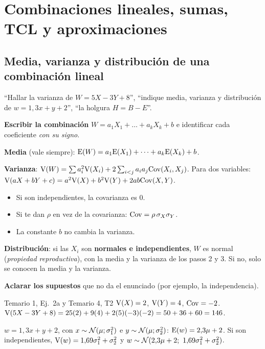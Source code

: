 \newpage
\section{Combinaciones lineales, sumas, TCL y aproximaciones}

\subsection{Media, varianza y distribución de una combinación lineal}\label{p:comblin}
\begin{cuando}
``Hallar la varianza de $W=5X-3Y+8$'', ``indique media, varianza y distribución de $w=1{,}3x+y+2$'', ``la holgura $H=B-E$''.
\end{cuando}
\begin{pasos}
\begin{pasolista}
\item \textbf{Escribir la combinación} $W=a_1X_1+\dots+a_kX_k+b$ e identificar cada coeficiente \emph{con su signo}.
\item \textbf{Media} (vale siempre): $\mathrm{E}(W)=a_1\mathrm{E}(X_1)+\dots+a_k\mathrm{E}(X_k)+b$.
\item \textbf{Varianza}: $\mathrm{V}(W)=\sum a_i^2\mathrm{V}(X_i)+2\sum_{i<j}a_ia_j\mathrm{Cov}(X_i,X_j)$. Para dos variables: $\mathrm{V}(aX+bY+c)=a^2\mathrm{V}(X)+b^2\mathrm{V}(Y)+2ab\mathrm{Cov}(X,Y)$.
\begin{itemize}
\item Si son independientes, la covarianza es 0.
\item Si te dan $\rho$ en vez de la covarianza: $\mathrm{Cov}=\rho\,\sigma_X\sigma_Y$.
\item La constante $b$ no cambia la varianza.
\end{itemize}
\item \textbf{Distribución}: si las $X_i$ son \textbf{normales e independientes}, $W$ es normal (\emph{propiedad reproductiva}), con la media y la varianza de los pasos 2 y 3. Si no, solo se conocen la media y la varianza.
\item \textbf{Aclarar los supuestos} que no da el enunciado (por ejemplo, la independencia).
\end{pasolista}
\end{pasos}
\begin{modelo}{Temario 1, Ej.\ 2a y Temario 4, T2}
$\mathrm{V}(X)=2$, $\mathrm{V}(Y)=4$, $\mathrm{Cov}=-2$. \ $\mathrm{V}(5X-3Y+8)=25(2)+9(4)+2(5)(-3)(-2)=50+36+60=146$.

$w=1{,}3x+y+2$, con $x\sim\mathcal{N}(\mu;\sigma_1^2)$ e $y\sim\mathcal{N}(\mu;\sigma_2^2)$: $\mathrm{E}(w)=2{,}3\mu+2$. Si son independientes, $\mathrm{V}(w)=1{,}69\sigma_1^2+\sigma_2^2$ y $w\sim\Nor(2{,}3\mu+2;\ 1{,}69\sigma_1^2+\sigma_2^2)$.
\end{modelo}
